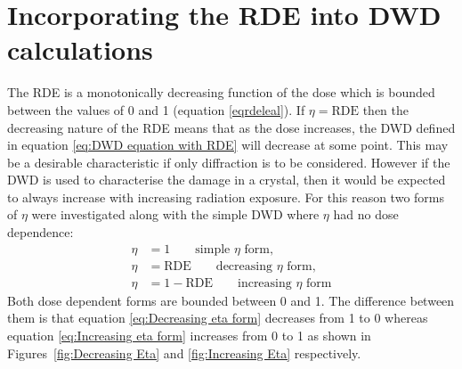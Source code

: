 \section{Incorporating the RDE into DWD calculations}
\label{sec:Incorporating the RDE into DWD Calculations}
The RDE is a monotonically decreasing function of the dose which is bounded between the values of 0 and 1 (equation \ref{eqrdeleal}).
If $\eta = \text{RDE}$ then the decreasing nature of the RDE means that as the dose increases, the DWD defined in equation \ref{eq:DWD equation with RDE} will decrease at some point.
This may be a desirable characteristic if only diffraction is to be considered.
However if the DWD is used to characterise the damage in a crystal, then it would be expected to always increase with increasing radiation exposure.
For this reason two forms of $\eta$ were investigated along with the simple DWD where $\eta$ had no dose dependence:
\begin{align}
    \eta &= 1 \qquad \text{simple $\eta$ form}, \label{eq:Simple eta form} \\
    \eta &= \text{RDE} \qquad \text{decreasing $\eta$ form}, \label{eq:Decreasing eta form} \\
    \eta &= 1 - \text{RDE} \qquad \text{increasing $\eta$ form} \label{eq:Increasing eta form}
\end{align}
Both dose dependent forms are bounded between 0 and 1.
The difference between them is that equation \ref{eq:Decreasing eta form} decreases from 1 to 0 whereas equation \ref{eq:Increasing eta form} increases from 0 to 1 as shown in Figures~\ref{fig:Decreasing Eta} and \ref{fig:Increasing Eta} respectively.
